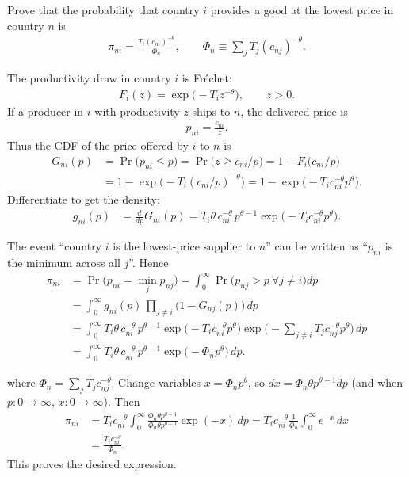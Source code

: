 Prove that the probability that country $i$ provides a good at the lowest price in country $n$ is
\begin{align*}
\pi_{ni} = \frac{T_i (c_{ni})^{-\theta}}{\Phi_n},
\qquad
\Phi_n \equiv \sum_j T_j (c_{nj})^{-\theta}.
\end{align*}

\begin{solution}
The productivity draw in country $i$ is Fr\'echet:
\begin{align*}
F_i(z) = \exp\big(-T_i z^{-\theta}\big), \qquad z>0.
\end{align*}
If a producer in $i$ with productivity $z$ ships to $n$, the delivered price is
\begin{align*}
p_{ni}=\frac{c_{ni}}{z}.
\end{align*}
Thus the CDF of the price offered by $i$ to $n$ is
\begin{align*}
G_{ni}(p)
&= \Pr\big(p_{ni}\le p\big)
= \Pr\big(z \ge c_{ni}/p\big)
= 1 - F_i\!\big(c_{ni}/p\big) \\
&= 1 - \exp\!\big(-T_i (c_{ni}/p)^{-\theta}\big)
= 1 - \exp\!\big(-T_i c_{ni}^{-\theta} p^{\theta}\big).
\end{align*}
Differentiate to get the density:
\begin{align*}
g_{ni}(p)
&= \frac{d}{dp}G_{ni}(p)
= T_i \theta\, c_{ni}^{-\theta}\, p^{\theta-1}
    \exp\!\big(-T_i c_{ni}^{-\theta} p^{\theta}\big).
\end{align*}

The event ``country $i$ is the lowest-price supplier to $n$'' can be written as
``$p_{ni}$ is the minimum across all $j$''. Hence
\begin{align*}
\pi_{ni}
&= \Pr\big(p_{ni} = \min_j p_{nj}\big)
= \int_0^\infty \Pr\big(p_{nj}>p\ \forall j\neq i\big) dp \\
&= \int_0^\infty g_{ni}(p)\, \prod_{j\neq i}\big(1-G_{nj}(p)\big)\, dp \\
&= \int_0^\infty T_i \theta\, c_{ni}^{-\theta}\, p^{\theta-1}
    \exp\!\big(-T_i c_{ni}^{-\theta} p^{\theta}\big)
    \exp\!\Big(-\sum_{j\neq i} T_j c_{nj}^{-\theta} p^{\theta}\Big)\, dp \\
&= \int_0^\infty T_i \theta\, c_{ni}^{-\theta}\, p^{\theta-1}
    \exp\!\big(-\Phi_n p^{\theta}\big)\, dp.
\end{align*}

where $\Phi_n = \sum_j T_j c_{nj}^{-\theta}$. Change variables $x=\Phi_n p^{\theta}$, so $dx = \Phi_n \theta p^{\theta-1} dp$ (and when $p:0\to\infty$, $x:0\to\infty$). Then
\begin{align*}
\pi_{ni}
&= T_i c_{ni}^{-\theta} \int_0^\infty \frac{\Phi_n \theta p^{\theta-1}}{\Phi_n \theta p^{\theta-1}}
    \exp(-x)\, dp
= T_i c_{ni}^{-\theta} \frac{1}{\Phi_n}\int_0^\infty e^{-x}\, dx \\
&= \frac{T_i c_{ni}^{-\theta}}{\Phi_n}.
\end{align*}
This proves the desired expression.
\end{solution}
